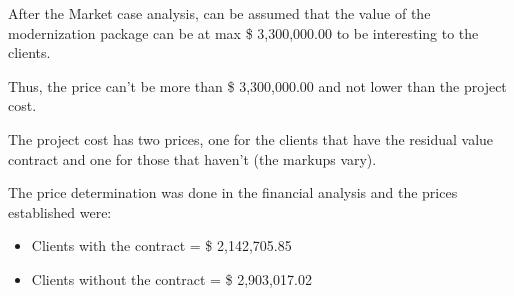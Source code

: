After the Market case analysis, can be assumed that the value of the modernization package can be at max  \$ 3,300,000.00 to be interesting to the clients.

Thus, the price can't be more than \$ 3,300,000.00 and not lower than the project cost.

The project cost has two prices, one for the clients that have the residual value contract and one for those that haven't (the markups vary).

The price determination was done in the financial analysis and the prices established were:

\begin{itemize}
  \item Clients with the contract = \$ 2,142,705.85
  \item Clients without the contract = \$ 2,903,017.02 
\end{itemize}
